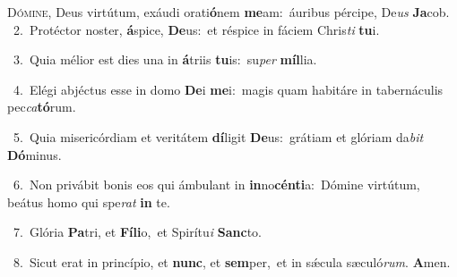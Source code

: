 \lettrine{\initial\textcolor{\initialcolor}{D}}{ómine,} Deus virtútum, exáudi orati\-\textbf{ó}\-nem \textbf{me}\-am:~\star áuribus pércipe, De\textit{us} \textbf{Ja}\-cob.\\
{\numbfont\textcolor{\numbcolor}{~2.}}~Protéctor noster, \textbf{á}\-spice, \textbf{De}\-us:~\star et réspice in fáciem Chris\textit{ti} \textbf{tu}\-i.\par
{\numbfont\textcolor{\numbcolor}{~3.}}~Quia mélior est dies una in \textbf{á}\-triis \textbf{tu}\-is:~\star su\textit{per} \textbf{míl}\-lia.\par
{\numbfont\textcolor{\numbcolor}{~4.}}~Elégi abjéctus esse in domo \textbf{De}\-i \textbf{me}\-i:~\star magis quam habitáre in tabernáculis pec\-\textit{ca}\-\textbf{tó}rum.\par
{\numbfont\textcolor{\numbcolor}{~5.}}~Quia misericórdiam et veritátem \textbf{dí}\-ligit \textbf{De}\-us:~\star grátiam et glóriam da\textit{bit} \textbf{Dó}\-minus.\par
{\numbfont\textcolor{\numbcolor}{~6.}}~Non privábit bonis eos qui ámbulant in \textbf{in}\-no\-\textbf{cén}\-\textbf{ti}a:~\star Dómine virtútum, beátus homo qui spe\textit{rat} \textbf{in} te.\par
{\numbfont\textcolor{\numbcolor}{~7.}}~Glória \textbf{Pa}\-tri, et \textbf{Fí}\-\textbf{li}o,~\star et Spirítu\textit{i} \textbf{Sanc}\-to.\par
{\numbfont\textcolor{\numbcolor}{~8.}}~Sicut erat in princípio, et \textbf{nunc}\-, et \textbf{sem}\-per,~\star et in sǽcula sæculó\-\textit{rum}\-. \textbf{A}\-men.\par
